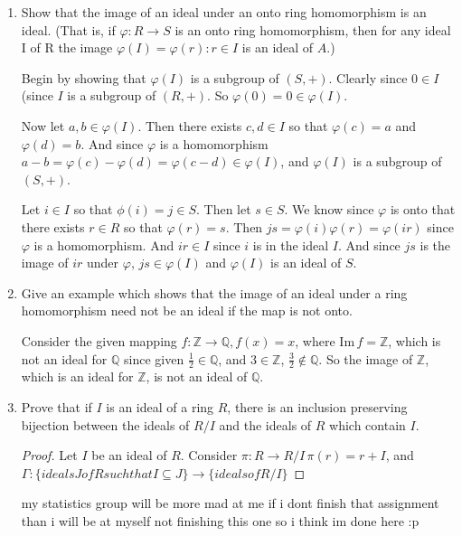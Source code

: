 \documentclass{article}
\begin{document}
\begin{enumerate}
\begin{enumerate}[label= (\alph*)]
        \item Show that the image of an ideal under an onto ring homomorphism is an ideal. (That
        is, if $\varphi : R \to  S$ is an onto ring homomorphism, then for any ideal I of R the image
        $\varphi(I) = {\varphi(r) : r \in I}$ is an ideal of $A$.)

        Begin by showing that $\varphi(I)$ is a subgroup of $(S,+)$. Clearly since $0\in I$ (since
        $I$ is a subgroup of $(R,+)$. So $\varphi(0)=0\in \varphi(I)$.

        Now let $a,b\in \varphi(I)$. Then there exists $c,d\in I$ so that $\varphi(c)=a$ and
        $\varphi(d)=b$. And since $\varphi$ is a homomorphism 
        $a-b=\varphi(c)-\varphi(d)=\varphi(c-d)\in \varphi(I)$, and $\varphi(I)$ is a subgroup of 
        $(S,+)$.

        Let $i\in I$ so that $\phi(i)=j\in S$. Then let $s\in S$. We know since $\varphi$ is onto
        that there exists $r\in R$ so that $\varphi(r)=s$. Then $js=\varphi(i)\varphi(r)=\varphi(ir)$
        since $\varphi$ is a homomorphism. And $ir\in I$ since $i$ is in the ideal $I$.
        And since $js$ is the image of $ir$ under $\varphi$, $js\in \varphi(I)$ and $\varphi(I)$ is
        an ideal of $S$.

        \item Give an example which shows that the image of an ideal under a ring homomorphism
        need not be an ideal if the map is not onto. 

        Consider the given mapping $f:\mathbb{Z}\to \mathbb{Q}, f(x)=x$, where $\mathrm{Im}\,f=\mathbb{Z}$,
        which is not an ideal for $\mathbb{Q}$ since given $\frac{1}{2}\in \mathbb{Q}$, and $3\in \mathbb{Z}$,
        $\frac{3}{2}\not\in \mathbb{Q}$. So the image of $\mathbb{Z}$, which is an ideal
        for $\mathbb{Z}$, is not an ideal of $\mathbb{Q}$.

        \item Prove that if $I$ is an ideal of a ring $R$, there is an inclusion preserving bijection between
        the ideals of $R/I$ and the ideals of $R$ which contain $I$.
\iffalse
Translation : Show that there is a bijection Γ : { ideals J of R such that I ⊆ J} → { ideals of R/I}
such that Γ is inclusion-preserving i.e., J ⊆ J′ if and only if Γ (J) ⊆ Γ (J′).
Hint : Consider the map π : R → R/I, given by π(r) = r + I. Apply (a) and (b).
\fi

\begin{proof}
    Let $I$ be an ideal of $R$. Consider $\pi:R\to R /I\, \pi(r)=r+I$, and 
    $\Gamma: \{ideals J of R such that I \subseteq J \} \to 
    \{ideals of R/I\}$ 

\end{proof}
    my statistics group will be more mad at me if i dont finish that assignment than i will be at myself not finishing this one so i think im done here :p
    \end{enumerate}
\end{enumerate}
\end{document}

